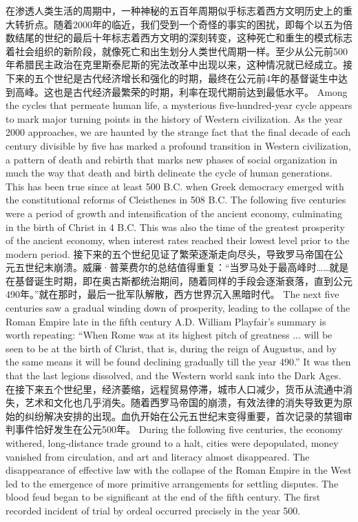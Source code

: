 \begin{paracol}{2}
\switchcolumn*
在渗透人类生活的周期中，一种神秘的五百年周期似乎标志着西方文明历史上的重大转折点。随着2000年的临近，我们受到一个奇怪的事实的困扰，即每个以五为倍数结尾的世纪的最后十年标志着西方文明的深刻转变，这种死亡和重生的模式标志着社会组织的新阶段，就像死亡和出生划分人类世代周期一样。至少从公元前500年希腊民主政治在克里斯泰尼斯的宪法改革中出现以来，这种情况就已经成立。接下来的五个世纪是古代经济增长和强化的时期，最终在公元前4年的基督诞生中达到高峰。这也是古代经济最繁荣的时期，利率在现代期前达到最低水平。
\switchcolumn
Among the cycles that permeate human life, a mysterious five-hundred-year cycle appears to mark major turning points in the history of Western civilization. As the year 2000 approaches, we are haunted by the strange fact that the final decade of each century divisible by five has marked a profound transition in Western civilization, a pattern of death and rebirth that marks new phases of social organization in much the way that death and birth delineate the cycle of human generations. This has been true since at least 500 B.C. when Greek democracy emerged with the constitutional reforms of Cleisthenes in 508 B.C. The following five centuries were a period of growth and intensification of the ancient economy, culminating in the birth of Christ in 4 B.C. This was also the time of the greatest prosperity of the ancient economy, when interest rates reached their lowest level prior to the modern period.
\switchcolumn*
接下来的五个世纪见证了繁荣逐渐走向尽头，导致罗马帝国在公元五世纪末崩溃。威廉·普莱费尔的总结值得重复：“当罗马处于最高峰时……就是在基督诞生时期，即在奥古斯都统治期间，随着同样的手段会逐渐衰落，直到公元490年。”就在那时，最后一批军队解散，西方世界沉入黑暗时代。
\switchcolumn
The next five centuries saw a gradual winding down of prosperity, leading to the collapse of the Roman Empire late in the fifth century A.D. William Playfair's summary is worth repeating: ``When Rome was at its highest pitch of greatness ... will be seen to be at the birth of Christ, that is, during the reign of Augustus, and by the same means it will be found declining gradually till the year 490.'' It was then that the last legions dissolved, and the Western world sank into the Dark Ages.
\switchcolumn*
在接下来五个世纪里，经济萎缩，远程贸易停滞，城市人口减少，货币从流通中消失，艺术和文化也几乎消失。随着西罗马帝国的崩溃，有效法律的消失导致更为原始的纠纷解决安排的出现。血仇开始在公元五世纪末变得重要，首次记录的禁锢审判事件恰好发生在公元500年。
\switchcolumn
During the following five centuries, the economy withered, long-distance trade ground to a halt, cities were depopulated, money vanished from circulation, and art and literacy almost disappeared. The disappearance of effective law with the collapse of the Roman Empire in the West led to the emergence of more primitive arrangements for settling disputes. The blood feud began to be significant at the end of the fifth century. The first recorded incident of trial by ordeal occurred precisely in the year 500.

\end{paracol}
